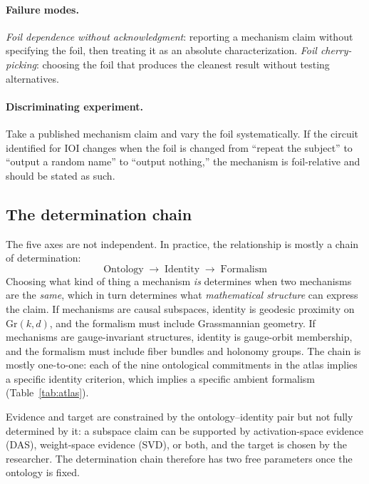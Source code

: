 \documentclass{article}
\newcommand{\Gr}{\mathrm{Gr}}
\begin{document}
\paragraph{Failure modes.}
\emph{Foil dependence without acknowledgment}: reporting a mechanism
claim without specifying the foil, then treating it as an absolute
characterization.  \emph{Foil cherry-picking}: choosing the foil that
produces the cleanest result without testing alternatives.

\paragraph{Discriminating experiment.}
Take a published mechanism claim and vary the foil systematically.  If
the circuit identified for IOI changes when the foil is changed from
``repeat the subject'' to ``output a random name'' to ``output nothing,''
the mechanism is foil-relative and should be stated as such.

\subsection{The determination chain}\label{sec:chain}

The five axes are not independent.  In practice, the relationship is
mostly a chain of determination:
\[
\text{Ontology} \;\longrightarrow\; \text{Identity} \;\longrightarrow\; \text{Formalism}
\]
Choosing what kind of thing a mechanism \emph{is} determines when two
mechanisms are the \emph{same}, which in turn determines what
\emph{mathematical structure} can express the claim.  If mechanisms are
causal subspaces, identity is geodesic proximity on $\Gr(k,d)$, and the
formalism must include Grassmannian geometry.  If mechanisms are
gauge-invariant structures, identity is gauge-orbit membership, and the
formalism must include fiber bundles and holonomy groups.  The chain is
mostly one-to-one: each of the nine ontological commitments in the atlas
implies a specific identity criterion, which implies a specific ambient
formalism (Table~\ref{tab:atlas}).

Evidence and target are constrained by the ontology--identity pair but
not fully determined by it: a subspace claim can be supported by
activation-space evidence (DAS), weight-space evidence (SVD), or both,
and the target is chosen by the researcher.  The determination chain
therefore has two free parameters once the ontology is fixed.
\end{document}
